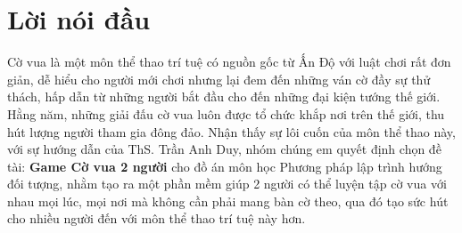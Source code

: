 \section*{Lời nói đầu}
Cờ vua là một môn thể thao trí tuệ có nguồn gốc từ Ấn Độ với luật chơi rất đơn giản, dễ hiểu cho người mới chơi nhưng lại đem đến những ván cờ đầy sự thử thách, hấp dẫn từ những người bắt đầu cho đến những đại kiện tướng thế giới. Hằng năm, những giải đấu cờ vua luôn được tổ chức khắp nơi trên thế giới, thu hút lượng người tham gia đông đảo. Nhận thấy sự lôi cuốn của môn thể thao này, với sự hướng dẫn của ThS. Trần Anh Duy, nhóm chúng em quyết định chọn đề tài: \textbf{Game Cờ vua 2 người} cho đồ án môn học Phương pháp lập trình hướng đối tượng, nhằm tạo ra một phần mềm giúp 2 người có thể luyện tập cờ vua với nhau mọi lúc, mọi nơi mà không cần phải mang bàn cờ theo, qua đó tạo sức hút cho nhiều người đến với môn thể thao trí tuệ này hơn.\\